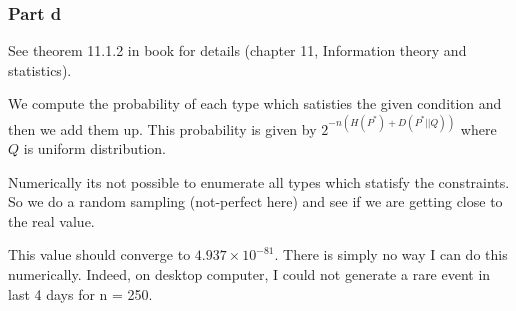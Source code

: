 \documentclass[]{article}
\begin{document}
\subsubsection{Part d}\label{part-d}

See theorem 11.1.2 in book for details (chapter 11, Information theory
and statistics).

We compute the probability of each type which satisties the given
condition and then we add them up. This probability is given by
\(2^{-n(H(P^*)+D(P^*||Q))}\) where \(Q\) is uniform distribution.

Numerically its not possible to enumerate all types which statisfy the
constraints. So we do a random sampling (not-perfect here) and see if we
are getting close to the real value.


This value should converge to \(4.937\times10^{-81}\). There is simply
no way I can do this numerically. Indeed, on desktop computer, I could
not generate a rare event in last 4 days for n = 250.
\end{document}
